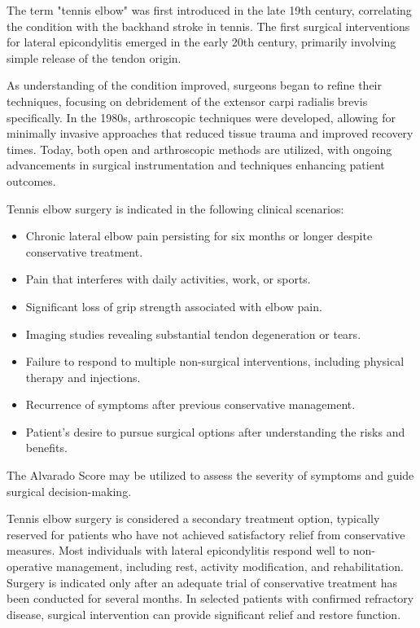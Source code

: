 The term "tennis elbow" was first introduced in the late 19th century, correlating the condition with the backhand stroke in tennis. The first surgical interventions for lateral epicondylitis emerged in the early 20th century, primarily involving simple release of the tendon origin. 

As understanding of the condition improved, surgeons began to refine their techniques, focusing on debridement of the extensor carpi radialis brevis specifically. In the 1980s, arthroscopic techniques were developed, allowing for minimally invasive approaches that reduced tissue trauma and improved recovery times. Today, both open and arthroscopic methods are utilized, with ongoing advancements in surgical instrumentation and techniques enhancing patient outcomes.

Tennis elbow surgery is indicated in the following clinical scenarios:

\begin{itemize}
  \item Chronic lateral elbow pain persisting for six months or longer despite conservative treatment.
  \item Pain that interferes with daily activities, work, or sports.
  \item Significant loss of grip strength associated with elbow pain.
  \item Imaging studies revealing substantial tendon degeneration or tears.
  \item Failure to respond to multiple non-surgical interventions, including physical therapy and injections.
  \item Recurrence of symptoms after previous conservative management.
  \item Patient's desire to pursue surgical options after understanding the risks and benefits.
\end{itemize}

The Alvarado Score may be utilized to assess the severity of symptoms and guide surgical decision-making.

Tennis elbow surgery is considered a secondary treatment option, typically reserved for patients who have not achieved satisfactory relief from conservative measures. Most individuals with lateral epicondylitis respond well to non-operative management, including rest, activity modification, and rehabilitation. Surgery is indicated only after an adequate trial of conservative treatment has been conducted for several months. In selected patients with confirmed refractory disease, surgical intervention can provide significant relief and restore function.

